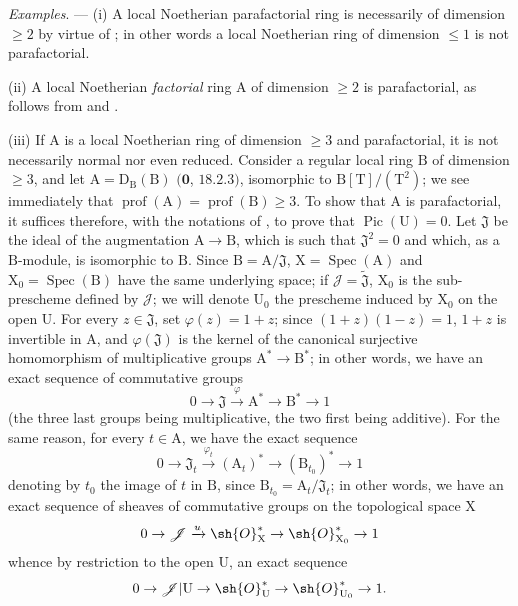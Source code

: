 \begin{env}[21.13.9]
\label{IV.21.13.9}
\emph{Examples}. ---
(i)
A local Noetherian parafactorial ring is necessarily of dimension $\geq 2$ by virtue of ; in other words a local Noetherian ring of dimension $\leq 1$ is not parafactorial.

(ii)
A local Noetherian \emph{factorial} ring $\mathrm{A}$ of dimension $\geq 2$ is parafactorial, as follows from  and .

(iii)
If $\mathrm{A}$ is a local Noetherian ring of dimension $\geq 3$ and parafactorial, it is not necessarily normal nor even reduced.
Consider a regular local ring $\mathrm{B}$ of dimension $\geq 3$, and let $\mathrm{A}=\mathrm{D}_{\mathrm{B}}(\mathrm{B})$ $(\mathbf{0}$, $18.2.3)$, isomorphic to $\mathrm{B}[\mathrm{T}]/(\mathrm{T}^2)$; we see immediately that $\operatorname{prof}(\mathrm{A})=\operatorname{prof}(\mathrm{B})\geq 3$.
To show that $\mathrm{A}$ is parafactorial, it suffices therefore, with the notations of , to prove that $\operatorname{Pic}(\mathrm{U})=0$.
Let $\mathfrak{J}$ be the ideal of the augmentation $\mathrm{A}\to\mathrm{B}$, which is such that $\mathfrak{J}^2=0$ and which, as a $\mathrm{B}$-module, is isomorphic to $\mathrm{B}$.
Since $\mathrm{B}=\mathrm{A}/\mathfrak{J}$, $\mathrm{X}=\operatorname{Spec}(\mathrm{A})$ and $\mathrm{X}_0=\operatorname{Spec}(\mathrm{B})$ have the same underlying space; if $\mathscr{J}=\widetilde{\mathfrak{J}}$, $\mathrm{X}_0$ is the sub-prescheme defined by $\mathscr{J}$; we will denote $\mathrm{U}_0$ the prescheme induced by $\mathrm{X}_0$ on the open $\mathrm{U}$.
For every $z\in\mathfrak{J}$, set $\varphi(z)=1+z$; since $(1+z)(1-z)=1$, $1+z$ is invertible in $\mathrm{A}$, and $\varphi(\mathfrak{J})$ is the kernel of the canonical surjective homomorphism of multiplicative groups $\mathrm{A}^*\to\mathrm{B}^*$; in other words, we have an exact sequence of commutative groups
\[
  0\to\mathfrak{J}\xrightarrow{\varphi}\mathrm{A}^*\to\mathrm{B}^*\to 1
\]
(the three last groups being multiplicative, the two first being additive).
For the same reason, for every $t\in\mathrm{A}$, we have the exact sequence
\[
  0\to\mathfrak{J}_t\xrightarrow{\varphi_t}(\mathrm{A}_t)^*\to(\mathrm{B}_{t_0})^*\to 1
\]
denoting by $t_0$ the image of $t$ in $\mathrm{B}$, since $\mathrm{B}_{t_0}=\mathrm{A}_t/\mathfrak{J}_t$; in other words, we have an exact sequence of sheaves of commutative groups on the topological space $\mathrm{X}$
\[
  0\to\mathscr{J}\xrightarrow{u}\sh{O}_{\mathrm{X}}^*\to\sh{O}_{\mathrm{X}_0}^*\to 1
\]
whence by restriction to the open $\mathrm{U}$, an exact sequence
\[
  0\to\mathscr{J}|\mathrm{U}\to\sh{O}_{\mathrm{U}}^*\to\sh{O}_{\mathrm{U}_0}^*\to 1.
\]


\end{env}
